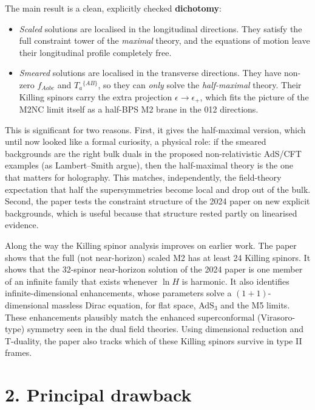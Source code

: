 \documentclass[11pt]{article}
\begin{document}
The main result is a clean, explicitly checked \textbf{dichotomy}:
\begin{itemize}
  \item \emph{Scaled} solutions are localised in the longitudinal directions. They satisfy the
  full constraint tower of the \emph{maximal} theory, and the equations of motion leave their
  longitudinal profile completely free.
  \item \emph{Smeared} solutions are localised in the transverse directions. They have
  non-zero $f_{Aabc}$ and $T_a{}^{\{AB\}}$, so they can \emph{only} solve the
  \emph{half-maximal} theory. Their Killing spinors carry the extra projection
  $\epsilon\to\epsilon_+$, which fits the picture of the M2NC limit itself as a
  half-BPS M2 brane in the 012 directions.
\end{itemize}
This is significant for two reasons. First, it gives the half-maximal version, which until now
looked like a formal curiosity, a physical role: if the smeared backgrounds are the right bulk
duals in the proposed non-relativistic AdS/CFT examples (as Lambert--Smith argue), then the
half-maximal theory is the one that matters for holography. This matches, independently, the
field-theory expectation that half the supersymmetries become local and drop out of the bulk.
Second, the paper tests the constraint structure of the 2024 paper on new explicit
backgrounds, which is useful because that structure rested partly on linearised evidence.

Along the way the Killing spinor analysis improves on earlier work. The paper shows that the
full (not near-horizon) scaled M2 has at least 24 Killing spinors. It shows that the
32-spinor near-horizon solution of the 2024 paper is one member of an infinite family that
exists whenever $\ln H$ is harmonic. It also identifies infinite-dimensional enhancements,
whose parameters solve a $(1+1)$-dimensional massless Dirac equation, for flat space, AdS$_3$
and the M5 limits. These enhancements plausibly match the enhanced superconformal (Virasoro-type)
symmetry seen in the dual field theories. Using dimensional reduction and T-duality, the paper
also tracks which of these Killing spinors survive in type II frames.

\section*{2. Principal drawback}
\end{document}

